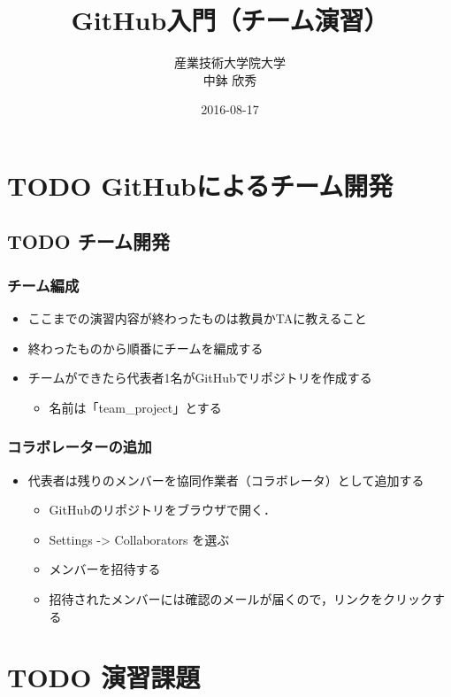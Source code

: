 \documentclass[a4paper,twoside,twocolumn]{bxjsarticle}
\author{産業技術大学院大学\\ 中鉢 欣秀}
\date{2016-08-17}
\title{GitHub入門（チーム演習）}
\begin{document}
\maketitle

\section{{\bfseries\sffamily TODO} GitHubによるチーム開発}
\label{sec-1}
\subsection{{\bfseries\sffamily TODO} チーム開発}
\label{sec-1-1}
\subsubsection{チーム編成}
\label{sec-1-1-1}
\begin{itemize}
\item ここまでの演習内容が終わったものは教員かTAに教えること
\item 終わったものから順番にチームを編成する
\item チームができたら代表者1名がGitHubでリポジトリを作成する
\begin{itemize}
\item 名前は「team\_project」とする
\end{itemize}
\end{itemize}

\subsubsection{コラボレーターの追加}
\label{sec-1-1-2}
\begin{itemize}
\item 代表者は残りのメンバーを協同作業者（コラボレータ）として追加する
\begin{itemize}
\item GitHubのリポジトリをブラウザで開く．
\item Settings -> Collaborators を選ぶ
\item メンバーを招待する
\item 招待されたメンバーには確認のメールが届くので，リンクをクリックする
\end{itemize}
\end{itemize}

\section{{\bfseries\sffamily TODO} 演習課題}
\label{sec-2}
\end{document}
